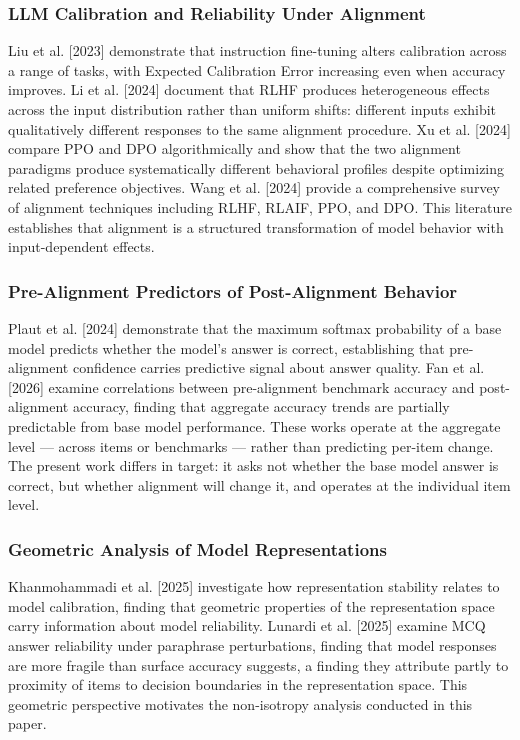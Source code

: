 
\subsubsection{LLM Calibration and Reliability Under Alignment}

Liu et al. [2023] demonstrate that instruction fine-tuning alters calibration across a range of tasks, with Expected Calibration Error increasing even when accuracy improves. Li et al. [2024] document that RLHF produces heterogeneous effects across the input distribution rather than uniform shifts: different inputs exhibit qualitatively different responses to the same alignment procedure. Xu et al. [2024] compare PPO and DPO algorithmically and show that the two alignment paradigms produce systematically different behavioral profiles despite optimizing related preference objectives. Wang et al. [2024] provide a comprehensive survey of alignment techniques including RLHF, RLAIF, PPO, and DPO. This literature establishes that alignment is a structured transformation of model behavior with input-dependent effects.

\subsubsection{Pre-Alignment Predictors of Post-Alignment Behavior}

Plaut et al. [2024] demonstrate that the maximum softmax probability of a base model predicts whether the model's answer is correct, establishing that pre-alignment confidence carries predictive signal about answer quality. Fan et al. [2026] examine correlations between pre-alignment benchmark accuracy and post-alignment accuracy, finding that aggregate accuracy trends are partially predictable from base model performance. These works operate at the aggregate level --- across items or benchmarks --- rather than predicting per-item change. The present work differs in target: it asks not whether the base model answer is correct, but whether alignment will change it, and operates at the individual item level.

\subsubsection{Geometric Analysis of Model Representations}

Khanmohammadi et al. [2025] investigate how representation stability relates to model calibration, finding that geometric properties of the representation space carry information about model reliability. Lunardi et al. [2025] examine MCQ answer reliability under paraphrase perturbations, finding that model responses are more fragile than surface accuracy suggests, a finding they attribute partly to proximity of items to decision boundaries in the representation space. This geometric perspective motivates the non-isotropy analysis conducted in this paper.

